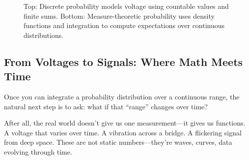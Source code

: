 \begin{figure}[H]
\centering
{}

\vspace{1em}
\caption{Top: Discrete probability models voltage using countable values and finite sums. Bottom: Measure-theoretic probability uses density functions and integration to compute expectations over continuous distributions.}
\end{figure}

\subsection{From Voltages to Signals: Where Math Meets Time}

Once you can integrate a probability distribution over a continuous range, the natural next step is to ask: what if that “range” changes over time?

After all, the real world doesn’t give us one measurement—it gives us functions. A voltage that varies over time. A vibration across a bridge. A flickering signal from deep space. These are not static numbers—they’re waves, curves, data evolving through time.

